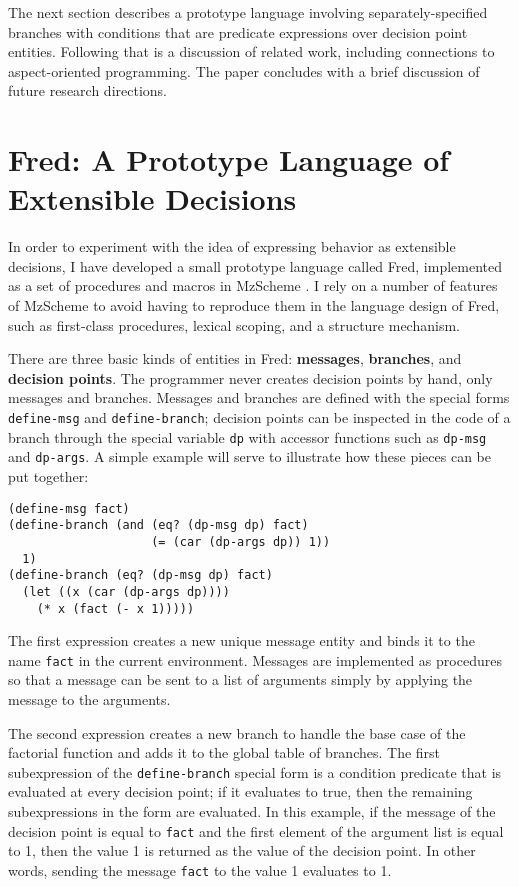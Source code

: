 \documentclass{article}
\newcommand{\defn}[1]{\textbf{#1}}
\newcommand{\code}[1]{\texttt{#1}}
\begin{document}
The next section describes a prototype language involving
separately-specified branches with conditions that are predicate
expressions over decision point entities.  Following that is a
discussion of related work, including connections to aspect-oriented
programming.  The paper concludes with a brief discussion of future
research directions.

\section{Fred: A Prototype Language of Extensible Decisions}
\label{section:fred}

In order to experiment with the idea of expressing behavior as
extensible decisions, I have developed a small prototype language
called Fred, implemented as a set of procedures and macros in MzScheme
\cite{flatt97plt}.  I rely on a number of features of MzScheme to avoid
having to reproduce them in the language design of Fred, such as
first-class procedures, lexical scoping, and a structure mechanism.

There are three basic kinds of entities in Fred: \defn{messages},
\defn{branches}, and \defn{decision points}.  The programmer never
creates decision points by hand, only messages and branches.  Messages 
and branches are defined with the special forms \code{define-msg} and
\code{define-branch}; decision points can be inspected in the code of a
branch through the special variable \code{dp} with accessor functions
such as \code{dp-msg} and \code{dp-args}.  A simple example will serve 
to illustrate how these pieces can be put together:

\begin{verbatim}
(define-msg fact)
(define-branch (and (eq? (dp-msg dp) fact)
                    (= (car (dp-args dp)) 1))
  1)
(define-branch (eq? (dp-msg dp) fact)
  (let ((x (car (dp-args dp))))
    (* x (fact (- x 1)))))
\end{verbatim}

The first expression creates a new unique message entity and binds it
to the name \code{fact} in the current environment.  Messages are
implemented as procedures so that a message can be sent to a list of
arguments simply by applying the message to the arguments.

The second expression creates a new branch to handle the base case of
the factorial function and adds it to the global table of branches.
The first subexpression of the \code{define-branch} special form is a
condition predicate that is evaluated at every decision point; if it
evaluates to true, then the remaining subexpressions in the form are
evaluated.  In this example, if the message of the decision point is
equal to \code{fact} and the first element of the argument list is
equal to 1, then the value 1 is returned as the value of the decision
point.  In other words, sending the message \code{fact} to the value 1
evaluates to 1.
\end{document}
